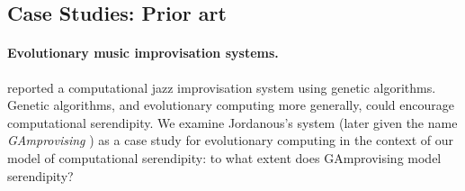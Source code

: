 




\subsection{Case Studies: Prior art}

\paragraph{Evolutionary music improvisation systems.}

 reported a computational jazz improvisation system using genetic algorithms. Genetic algorithms, and evolutionary computing more generally, could encourage computational serendipity. We examine Jordanous's system (later given the name {\em GAmprovising} \cite{jordanous:12}) as a case study for evolutionary computing in the context of our model of computational serendipity: to what extent does GAmprovising model serendipity?

